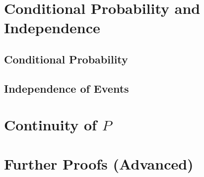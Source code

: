 \begin{example}
\end{example}

\begin{summary}
    \item {}
    \item {}
\end{summary}

\begin{exercises}
    \item {}
    \item {}
    \item {}
    \item {}
    \item {}
    \item {}
    \item {}
    \item {}
    \item {}
    \item {}
    \item {}
    \item {}
    \item {}
\end{exercises}

\begin{problems}
    \item {}
    \item {}
    \item {}
    \item {}
    \item {}
    \item {}
\end{problems}

\begin{challeges}
    \item {}
    \item {}
\end{challeges}

\section{Conditional Probability and Independence}\label{cond_prob_indp}
\lipsum[1-10]

\subsection{Conditional Probability}
\lipsum[1-10]

\subsection{Independence of Events}\label{independence_of_events}
\lipsum[1-10]

\section{Continuity of $P$}
\lipsum[1-10]

\section{Further Proofs (Advanced)}\label{ch2:adv_proofs}
\lipsum[1-10]